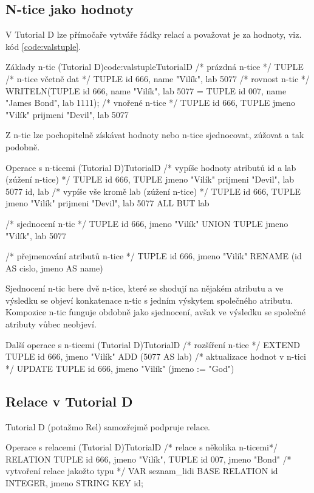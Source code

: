 \subsection{N-tice jako hodnoty}
V Tutorial D lze přímočaře vytváře řádky relací a považovat je za hodnoty, viz. kód \ref{code:valstuple}.
\begin{upcode}{Základy n-tic (Tutorial D)}{code:valstuple}{TutorialD}
/* prázdná n-tice */
TUPLE {}
/* n-tice včetně dat */
TUPLE {id 666, name "Vilík", lab 5077}
/* rovnost n-tic */
WRITELN(TUPLE {id 666, name "Vilík", lab 5077} = TUPLE {id 007, name "James Bond", lab 1111});
/* vnořené n-tice */
TUPLE {id 666, TUPLE {jmeno "Vilík" prijmeni "Devil"}, lab 5077}
\end{upcode}
Z n-tic lze pochopitelně získávat hodnoty nebo n-tice sjednocovat, zúžovat a tak podobně.
\begin{upcode}{Operace s n-ticemi (Tutorial D)}{}{TutorialD}
/* vypíše hodnoty atributů id a lab (zúžení n-tice) */
TUPLE {id 666, TUPLE {jmeno "Vilík" prijmeni "Devil"}, lab 5077} {id, lab}
/* vypíše vše kromě lab (zúžení n-tice) */
TUPLE {id 666, TUPLE {jmeno "Vilík" prijmeni "Devil"}, lab 5077} {ALL BUT lab}

/* sjednocení n-tic */
TUPLE {id 666, jmeno "Vilík"} UNION TUPLE {jmeno "Vilík", lab 5077}

/* přejmenování atributů n-tice */
TUPLE {id 666, jmeno "Vilík"} RENAME (id AS cislo, jmeno AS name)
\end{upcode}
Sjednocení n-tic bere dvě n-tice, které se shodují na nějakém atributu a ve výsledku se objeví konkatenace n-tic s jedním výskytem společného atributu. Kompozice n-tic funguje obdobně jako sjednocení, avšak ve výsledku se společné atributy vůbec neobjeví.
\begin{upcode}{Další operace s n-ticemi (Tutorial D)}{}{TutorialD}
/* rozšíření n-tice */
EXTEND TUPLE {id 666, jmeno "Vilík"} ADD (5077 AS lab)
/* aktualizace hodnot v n-tici */
UPDATE TUPLE {id 666, jmeno "Vilík"} (jmeno := "God")
\end{upcode}

\subsection{Relace v Tutorial D}
Tutorial D (potažmo Rel) samozřejmě podpruje relace.
\begin{upcode}{Operace s relacemi (Tutorial D)}{}{TutorialD}
/* relace s několika n-ticemi*/
RELATION {
	TUPLE {id 666, jmeno "Vilík"},
	TUPLE {id 007, jmeno "Bond"}
}
/* vytvoření relace jakožto typu */
VAR seznam_lidi BASE RELATION {id INTEGER, jmeno STRING} KEY {id};
\end{upcode}